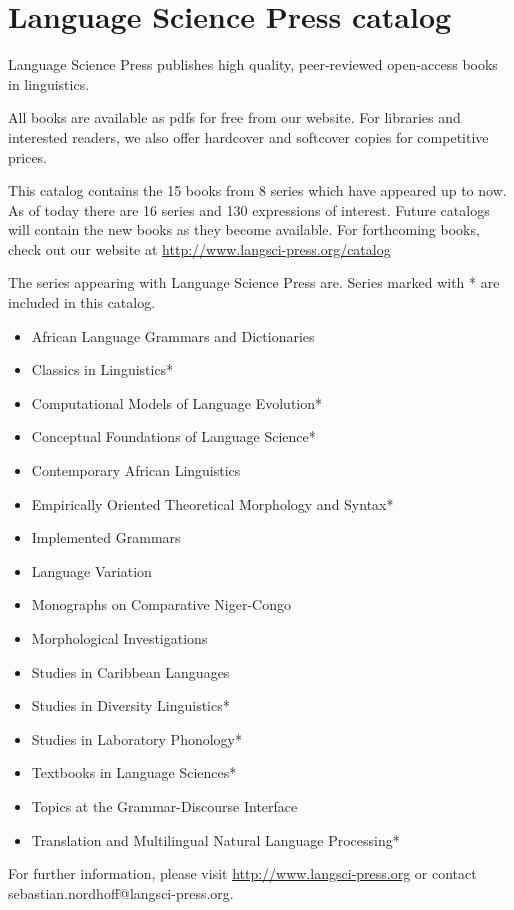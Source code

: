 \hspace{2cm}
\parbox{.8\textwidth}{
\chapter{Language Science Press catalog}
\large
Language Science Press publishes high quality, peer-reviewed open-access books in linguistics. 

All books are available as pdfs for free from our website. For libraries and interested readers, we also offer hardcover and softcover copies for competitive prices. 

This catalog contains the 15 books from 8 series which have appeared up to now. As of today there are 16 series and 130 expressions of interest. Future catalogs will contain the new books as they become available. For forthcoming books, check out our website at \url{http://www.langsci-press.org/catalog}

The series appearing with Language Science Press are. Series marked with * are included in this catalog.

\begin{itemize}
\item African Language Grammars and Dictionaries
\item Classics in Linguistics*
\item Computational Models of Language Evolution*
\item Conceptual Foundations of Language Science*
\item Contemporary African Linguistics
\item Em­pir­i­cal­ly Ori­ent­ed The­o­ret­i­cal Mor­phol­o­gy and Syn­tax*
\item Implemented Grammars
\item Language Variation
\item Monographs on Comparative Niger-Congo
\item Morphological Investigations
\item Studies in Caribbean Languages
\item Studies in Diversity Linguistics*
\item Studies in Laboratory Phonology*
\item Textbooks in Language Sciences*
\item Topics at the Grammar-Discourse Interface
\item Translation and Multilingual Natural Language Processing*
\end{itemize}

For further information, please visit \url{http://www.langsci-press.org} or contact sebastian.nordhoff@langsci-press.org.
}

